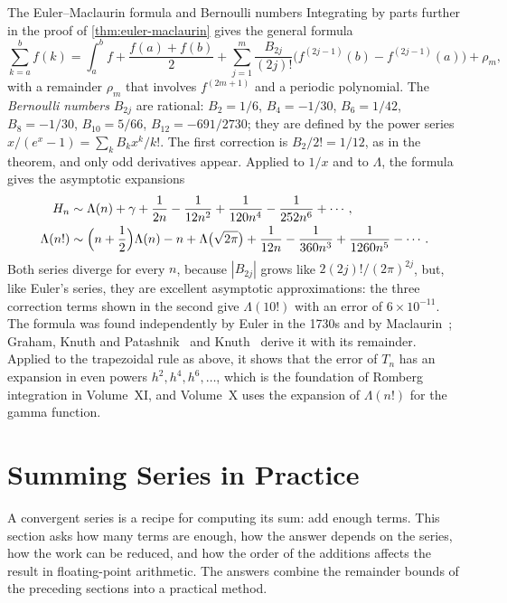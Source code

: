 \begin{note}{The Euler--Maclaurin formula and Bernoulli numbers}
Integrating by parts further in the proof of \cref{thm:euler-maclaurin} gives the general formula
\[
\sum_{k=a}^bf(k)=\int_a^bf+\frac{f(a)+f(b)}2+\sum_{j=1}^m\frac{B_{2j}}{(2j)!}\bigl(f^{(2j-1)}(b)-f^{(2j-1)}(a)\bigr)+\rho_m ,
\]
with a remainder $\rho_m$ that involves $f^{(2m+1)}$ and a periodic polynomial. The \emph{Bernoulli numbers} $B_{2j}$ are rational: $B_2=1/6$, $B_4=-1/30$, $B_6=1/42$, $B_8=-1/30$, $B_{10}=5/66$, $B_{12}=-691/2730$; they are defined by the power series $x/(e^x-1)=\sum_kB_kx^k/k!$. The first correction is $B_2/2!=1/12$, as in the theorem, and only odd derivatives appear. Applied to $1/x$ and to $\Lambda$, the formula gives the asymptotic expansions
\begin{align*}
H_n&\sim\Lambda(n)+\gamma+\frac1{2n}-\frac1{12n^2}+\frac1{120n^4}-\frac1{252n^6}+\cdots,\\
\Lambda(n!)&\sim\Bigl(n+\frac12\Bigr)\Lambda(n)-n+\Lambda\bigl(\sqrt{2\pi}\bigr)+\frac1{12n}-\frac1{360n^3}+\frac1{1260n^5}-\cdots .
\end{align*}
Both series diverge for every $n$, because $|B_{2j}|$ grows like $2(2j)!/(2\pi)^{2j}$, but, like Euler's series, they are excellent asymptotic approximations: the three correction terms shown in the second give $\Lambda(10!)$ with an error of $6\times10^{-11}$. The formula was found independently by Euler in the 1730s and by Maclaurin~\cite{maclaurin1742}; Graham, Knuth and Patashnik~\cite[Sect.~9.5]{graham1994concrete} and Knuth~\cite[Sect.~1.2.11.2]{knuth1997taocp1} derive it with its remainder. Applied to the trapezoidal rule as above, it shows that the error of $T_n$ has an expansion in even powers $h^2,h^4,h^6,\ldots$, which is the foundation of Romberg integration in Volume~XI, and Volume~X uses the expansion of $\Lambda(n!)$ for the gamma function.
\end{note}

\section{Summing Series in Practice}
\label{sec:summing}

A convergent series is a recipe for computing its sum: add enough terms. This section asks how many terms are enough, how the answer depends on the series, how the work can be reduced, and how the order of the additions affects the result in floating-point arithmetic. The answers combine the remainder bounds of the preceding sections into a practical method.

